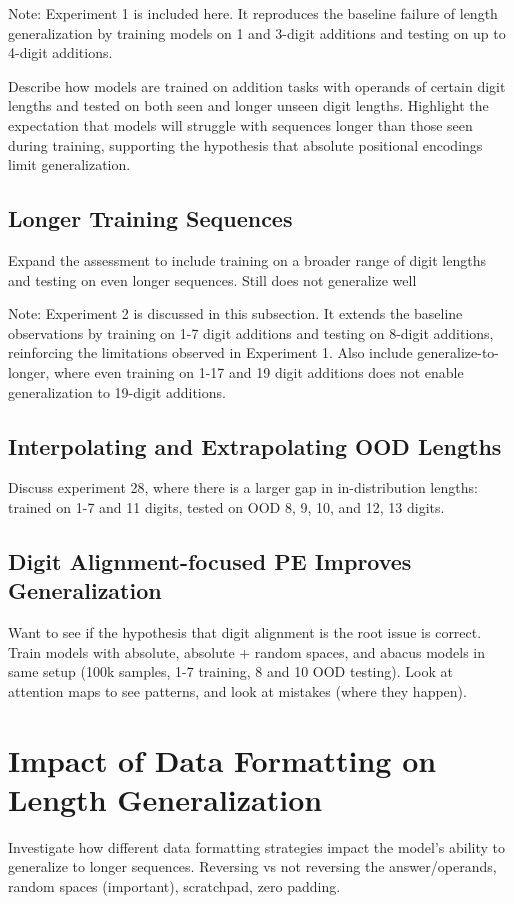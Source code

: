 Note: Experiment 1 is included here. It reproduces the baseline failure of length generalization by training models on 1 and 3-digit additions and testing on up to 4-digit additions.

Describe how models are trained on addition tasks with operands of certain digit lengths and tested on both seen and longer unseen digit lengths. Highlight the expectation that models will struggle with sequences longer than those seen during training, supporting the hypothesis that absolute positional encodings limit generalization.

\subsection{Longer Training Sequences}
Expand the assessment to include training on a broader range of digit lengths and testing on even longer sequences. Still does not generalize well

Note: Experiment 2 is discussed in this subsection. It extends the baseline observations by training on 1-7 digit additions and testing on 8-digit additions, reinforcing the limitations observed in Experiment 1. Also include generalize-to-longer, where even training on 1-17 and 19 digit additions does not enable generalization to 19-digit additions.

\subsection{Interpolating and Extrapolating OOD Lengths}
Discuss experiment 28, where there is a larger gap in in-distribution lengths: trained on 1-7 and 11 digits, tested on OOD 8, 9, 10, and 12, 13 digits.

\subsection{Digit Alignment-focused PE Improves Generalization}
Want to see if the hypothesis that digit alignment is the root issue is correct. Train models with absolute, absolute + random spaces, and abacus models in same setup (100k samples, 1-7 training, 8 and 10 OOD testing). Look at attention maps to see patterns, and look at mistakes (where they happen).


\section{Impact of Data Formatting on Length Generalization}\label{sec:data_formatting_improvement}
Investigate how different data formatting strategies impact the model's ability to generalize to longer sequences. Reversing vs not reversing the answer/operands, random spaces (important), scratchpad, zero padding.

